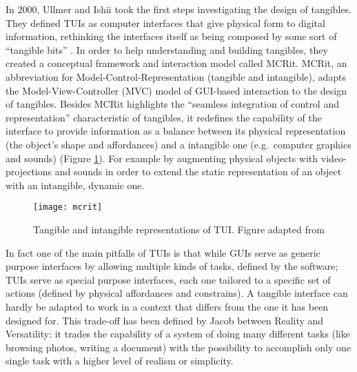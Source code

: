 In 2000, Ullmer and Ishii \autocite*{Ullmer:2000vf} took the first steps investigating the design of tangibles. They defined TUIs as computer interfaces that give physical form to digital information, rethinking the interfaces itself as being composed by some sort of ``tangible bits'' \autocite{Ishii:2008fh}. In order to help understanding and building tangibles, they created a conceptual framework and interaction model called MCRit. MCRit, an abbreviation for Model-Control-Representation (tangible and intangible), adapts the Model-View-Controller (MVC) model of GUI-based interaction to the design of tangibles. Besides MCRit highlights the ``seamless integration of control and representation'' characteristic of tangibles, it redefines the capability of the interface to provide information as a balance between its physical representation (the object's shape and affordances) and a intangible one (e.g.~computer graphics and sounds) (Figure \ref{fig:mcrit-model}). For example by augmenting physical objects with video-projections and sounds in order to extend the static representation of an object with an intangible, dynamic one.

\begin{figure}
	[tbh] \centering 
	\texttt{[image: mcrit]} \caption{Tangible and intangible representations of TUI. Figure adapted from \protect\autocite{Ishii:2008fh}} \label{fig:mcrit-model} 
\end{figure}

In fact one of the main pitfalls of TUIs is that while GUIs serve as generic purpose interfaces by allowing multiple kinds of tasks, defined by the software; TUIs serve as special purpose interfaces, each one tailored to a specific set of actions (defined by physical affordances and constrains). A tangible interface can hardly be adapted to work in a context that differs from the one it has been designed for. This trade-off has been defined by Jacob \autocite*{Jacob:2008vm} between Reality and Versatility: it trades the capability of a system of doing many different tasks (like browsing photos, writing a document) with the possibility to accomplish only one single task with a higher level of realism or simplicity.

